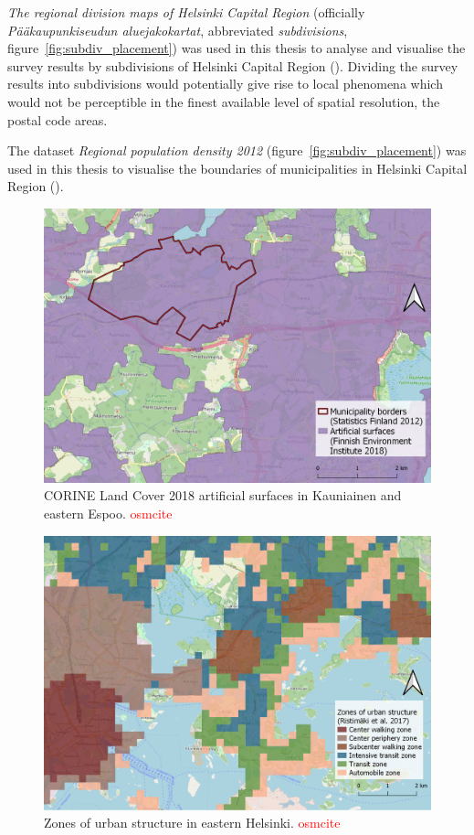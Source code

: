 \textit{The regional division maps of Helsinki Capital Region} (officially \textit{Pääkaupunkiseudun aluejakokartat}, abbreviated \textit{subdivisions}, figure~\ref{fig:subdiv_placement}) was used in this thesis to analyse and visualise the survey results by subdivisions of Helsinki Capital Region (\cite{HelsinginEspoonVantaanjaKauniaistenmittausorganisaatiot2011}). Dividing the survey results into subdivisions would potentially give rise to local phenomena which would not be perceptible in the finest available level of spatial resolution, the postal code areas.

The dataset \textit{Regional population density 2012} (figure~\ref{fig:subdiv_placement}) was used in this thesis to visualise the boundaries of municipalities in Helsinki Capital Region (\cite{StatisticsFinland2012}). 

\newpage
\begin{figure}[H]%
    \centering
    \includegraphics[width=.88\textwidth]{images/thesis_data_artificial.png}
    \caption[CORINE Land Cover 2018 artificial surfaces in Kauniainen and eastern Espoo.]{CORINE Land Cover 2018 artificial surfaces in Kauniainen and eastern Espoo. \textcolor{red}{osmcite}}%
    \label{fig:datalayers_corine}%
\end{figure}

\begin{figure}[H]%
    \centering
    \includegraphics[width=.88\textwidth]{images/thesis_data_ykr_zones.png}
    \caption[Zones of urban structure in eastern Helsinki.]{Zones of urban structure in eastern Helsinki. \textcolor{red}{osmcite}}%
    \label{fig:datalayers_ykr}%
\end{figure} 

